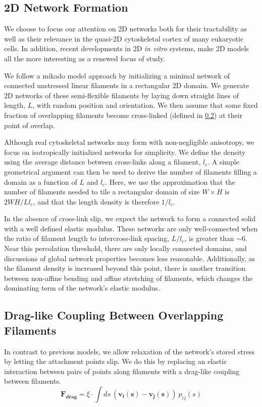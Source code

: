 \documentclass[pre,preprint]{revtex4-1}
\begin{document}
\subsection{2D Network Formation}

We choose to focus our attention on 2D networks both for their tractability as well as their relevance in the quasi-2D cytoskeletal cortex of many eukaryotic cells\cite{cellmech_flows}.  In addition, recent developments in 2D {\em in vitro} systems\cite{rheo_2D1,rheo_2D2}, make 2D models all the more interesting as a renewed focus of study.

We follow a mikado model approach by initializing a minimal network of connected unstressed linear filaments in a rectangular 2D domain.  We generate 2D networks of these semi-flexible filaments by laying down straight lines of length, $L$, with random position and orientation. We then assume that some fixed fraction of overlapping filaments become cross-linked (defined in \ref{exp_drag}) at their point of overlap.

Although real cytoskeletal networks may form with non-negligible anisotropy,  we  focus on isotropically initialized networks for simplicity.  We define the density using the average distance between cross-links along a filament, $l_c$. A simple geometrical argument can then be used to derive the number of filaments filling a domain as a function of $L$ and $l_c$\cite{theo_hlm}.  Here, we use the approximation that the number of filaments needed to tile a rectangular domain of size $W \times H$  is $2WH/Ll_c$, and that the length density is therefore $1/l_c$. 

In the absence of cross-link slip, we expect the network to form a connected solid with a well defined elastic modulus\cite{theo_hlm,theo_hlm2}.  These networks are only well-connected when the ratio of filament length to intercross-link spacing, $L/l_c$, is greater than $\sim 6$.  Near this percolation threshold, there are only locally connected domains, and discussions of global network properties becomes less reasonable.  Additionally, as the filament density is increased beyond this point, there is another transition between non-affine bending and affine stretching of filaments, which changes the dominating term of the network's elastic modulus.



\subsection{Drag-like Coupling Between Overlapping Filaments}
\label{exp_drag}
In contrast to previous models, we allow relaxation of the network's stored stress by letting the attachment points slip.  We do this by replacing an elastic interaction between pairs of points along filaments with a drag-like coupling between filaments.
\begin{equation}
\mathbf{F_{drag}} = \xi \cdot \int ds \: (\mathbf{v_i(s)}-\mathbf{v_j(s)}) \: p_{ij}(s)
\end{equation}
\end{document}
